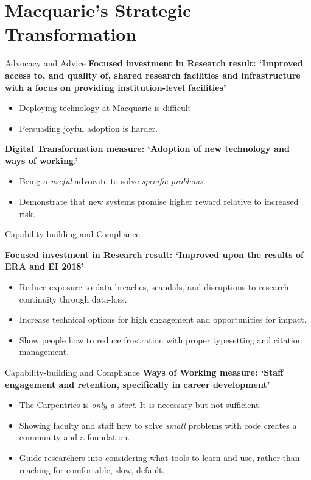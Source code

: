 \documentclass[aspectratio=169, 11pt]{beamer} %
\begin{document}
\section{Macquarie's Strategic Transformation}

\begin{frame}{Advocacy and Advice}
\textbf{Focused investment in Research result: `Improved access to, and quality of, shared research facilities and infrastructure with a focus on providing institution-level facilities'}

\begin{itemize}
    \item Deploying technology at Macquarie is difficult --
    \item Persuading joyful adoption is harder.
\end{itemize}

\textbf{Digital Transformation measure: `Adoption of new technology and ways of working.'}
\begin{itemize}
    \item Being a \textit{useful} advocate to solve \textit{specific problems}.
    \item Demonstrate that new systems promise higher reward relative to increased risk.
\end{itemize}
\end{frame}

\begin{frame}{Capability-building and Compliance}

\textbf{Focused investment in Research result: `Improved upon the results of ERA and EI 2018'}

\begin{itemize}
    \item Reduce exposure to data breaches,  scandals, and disruptions to research continuity through data-loss.
    \item Increase technical options for high engagement and opportunities for impact.
    \item Show people how to reduce frustration with proper typesetting and citation management.
\end{itemize}
\end{frame}

\begin{frame}{Capability-building and Compliance}
\textbf{Ways of Working measure: `Staff engagement and retention, specifically in career development'}
\begin{itemize}
    \item The Carpentries is \textit{only a start}. It is necessary but not sufficient.
    \item Showing faculty and staff how to solve \textit{small} problems with code creates a community and a foundation.
    \item Guide researchers into considering what tools to learn and use, rather than reaching for comfortable, slow, default.
\end{itemize}
\end{frame}
\end{document}
